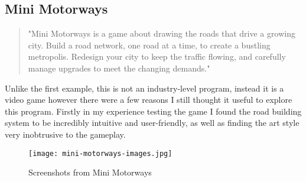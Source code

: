     \subsection{Mini Motorways}
    \label{mini-motorways}

    \begin{quote}
        "Mini Motorways is a game about drawing the roads that drive a growing city. Build a road network, one road at a time, to create a bustling metropolis. Redesign your city to keep the traffic flowing, and carefully manage upgrades to meet the changing demands."\cite{mini-motorways}
    \end{quote}

    Unlike the first example, this is not an industry-level program, instead it is a video game however there were a few reasons I still thought it useful to explore this program. Firstly in my experience testing the game I found the road building system to be incredibly intuitive and user-friendly, as well as finding the art style very inobtrusive to the gameplay.

    \begin{figure}[ht]
        \centering
        \texttt{[image: mini-motorways-images.jpg]}
        \caption{Screenshots from Mini Motorways}
    \end{figure}

